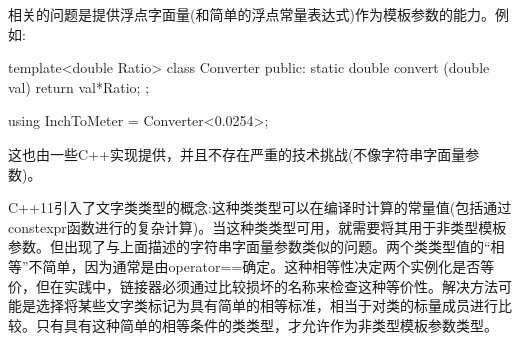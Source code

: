 相关的问题是提供浮点字面量(和简单的浮点常量表达式)作为模板参数的能力。例如:

\begin{cpp}
template<double Ratio>
class Converter {
	public:
	static double convert (double val) {
		return val*Ratio;
	}
};

using InchToMeter = Converter<0.0254>;
\end{cpp}

这也由一些C++实现提供，并且不存在严重的技术挑战(不像字符串字面量参数)。

C++11引入了文字类类型的概念:这种类类型可以在编译时计算的常量值(包括通过constexpr函数进行的复杂计算)。当这种类类型可用，就需要将其用于非类型模板参数。但出现了与上面描述的字符串字面量参数类似的问题。两个类类型值的“相等”不简单，因为通常是由operator==确定。这种相等性决定两个实例化是否等价，但在实践中，链接器必须通过比较损坏的名称来检查这种等价性。解决方法可能是选择将某些文字类标记为具有简单的相等标准，相当于对类的标量成员进行比较。只有具有这种简单的相等条件的类类型，才允许作为非类型模板参数类型。




































